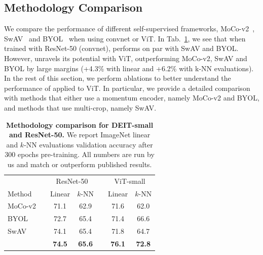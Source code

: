 \subsection{Methodology Comparison}
\label{ap:comp}
We compare the performance of different self-supervised frameworks, MoCo-v2~\cite{chen2020improved}, SwAV~\cite{caron2020unsupervised} and BYOL~\cite{grill2020bootstrap} when using convnet or ViT.
In Tab.~\ref{tab:vit_cnn}, we see that when trained with ResNet-50 (convnet), \OURS performs on par with SwAV and BYOL.
However, \OURS unravels its potential with ViT, outperforming MoCo-v2, SwAV and BYOL by large margins (+4.3\% with linear and +6.2\% with k-NN evaluations).
In the rest of this section, we perform ablations to better understand the performance of \OURS applied to ViT.
In particular, we provide a detailed comparison with methods that either use a momentum encoder, namely MoCo-v2 and BYOL, and methods that use multi-crop, namely SwAV.
\begin{table}[t]
\centering
  \caption{
	  \textbf{Methodology comparison for DEIT-small and ResNet-50.}
    We report ImageNet linear and $k$-NN evaluations validation accuracy after 300 epochs pre-training.
    All numbers are run by us and match or outperform published results.
  }
  \begin{tabular}{@{}ll cc c cc@{}}
    \toprule
  && \multicolumn{2}{c}{ResNet-50} && \multicolumn{2}{c}{ViT-small} \\
    \cmidrule{3-4}
    \cmidrule{6-7}
	  Method && Linear & $k$-NN && Linear & $k$-NN \\
    \midrule
	  MoCo-v2 && 71.1 & 62.9 && 71.6 & 62.0 \\
	  BYOL && 72.7 & 65.4 && 71.4 & 66.6 \\
	  SwAV && 74.1 & 65.4 && 71.8 & 64.7 \\
    \midrule
	  \OURS && \bf 74.5 & \bf 65.6  && \bf 76.1 & \bf 72.8 \\
    \bottomrule
  \end{tabular}
  \label{tab:vit_cnn}
\end{table}

